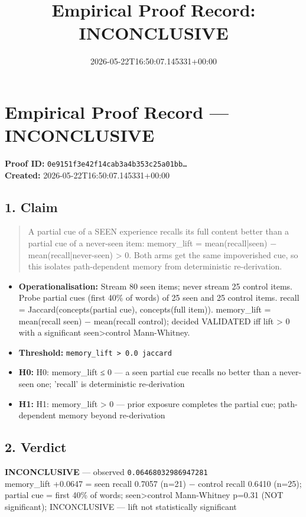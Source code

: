 \documentclass{article}
\title{Empirical Proof Record: INCONCLUSIVE}
\date{2026-05-22T16:50:07.145331+00:00}
\begin{document}
\maketitle
\section*{Empirical Proof Record --- \textcolor{inconclusive}{\textbf{INCONCLUSIVE}}}
\textbf{Proof ID:} \texttt{0e9151f3e42f14cab3a4b353c25a01bb\dots}\\
\textbf{Created:} 2026-05-22T16:50:07.145331+00:00
\subsection*{1. Claim}
\begin{quote}A partial cue of a SEEN experience recalls its full content better than a partial cue of a never-seen item: memory\_lift = mean(recall|seen) − mean(recall|never-seen) > 0. Both arms get the same impoverished cue, so this isolates path-dependent memory from deterministic re-derivation.\end{quote}
\begin{itemize}
\item \textbf{Operationalisation:} Stream 80 seen items; never stream 25 control items. Probe partial cues (first 40\% of words) of 25 seen and 25 control items. recall = Jaccard(concepts(partial cue), concepts(full item)). memory\_lift = mean(recall seen) − mean(recall control); decided VALIDATED iff lift > 0 with a significant seen>control Mann-Whitney.
\item \textbf{Threshold:} \texttt{memory\_lift > 0.0 jaccard}
\item \textbf{H0:} H0: memory\_lift ≤ 0 — a seen partial cue recalls no better than a never-seen one; 'recall' is deterministic re-derivation
\item \textbf{H1:} H1: memory\_lift > 0 — prior exposure completes the partial cue; path-dependent memory beyond re-derivation
\end{itemize}
\subsection*{2. Verdict}
\textcolor{inconclusive}{\textbf{INCONCLUSIVE}} --- observed \texttt{0.06468032986947281}\\
memory\_lift +0.0647 = seen recall 0.7057 (n=21) − control recall 0.6410 (n=25); partial cue = first 40\% of words; seen>control Mann-Whitney p=0.31 (NOT significant); INCONCLUSIVE — lift not statistically significant
\end{document}
